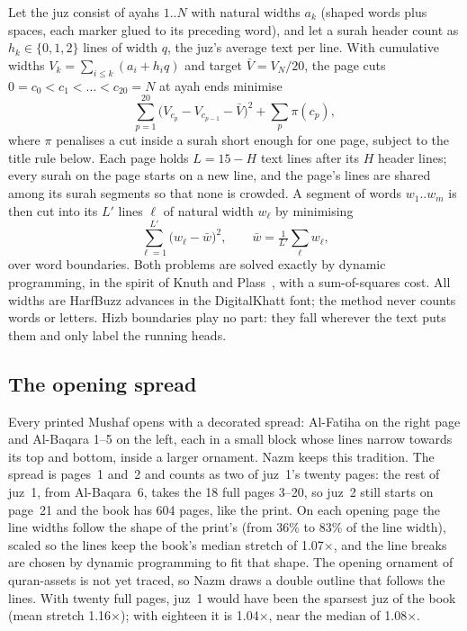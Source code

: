\documentclass[sigconf,nonacm]{acmart}
\newcommand{\x}{\ensuremath{\times}}
\begin{document}
Let the juz consist of ayahs $1..N$ with natural widths $a_k$ (shaped words plus spaces, each marker glued to its preceding word), and let a surah header count as $h_k\in\{0,1,2\}$ lines of width $q$, the juz's average text per line. With cumulative widths $V_k=\sum_{i\le k}(a_i+h_iq)$ and target $\bar V=V_N/20$, the page cuts $0=c_0<c_1<\dots<c_{20}=N$ at ayah ends minimise
\begin{equation}
  \sum_{p=1}^{20}\bigl(V_{c_p}-V_{c_{p-1}}-\bar V\bigr)^2+\sum_{p}\pi(c_p),
  \label{eq:pages}
\end{equation}
where $\pi$ penalises a cut inside a surah short enough for one page, subject to the title rule below. Each page holds $L=15-H$ text lines after its $H$ header lines; every surah on the page starts on a new line, and the page's lines are shared among its surah segments so that none is crowded. A segment of words $w_1..w_m$ is then cut into its $L'$ lines $\ell$ of natural width $w_\ell$ by minimising
\begin{equation}
  \sum_{\ell=1}^{L'}\bigl(w_\ell-\bar w\bigr)^2,\qquad \bar w=\tfrac{1}{L'}\textstyle\sum_\ell w_\ell,
  \label{eq:lines}
\end{equation}
over word boundaries. Both problems are solved exactly by dynamic programming, in the spirit of Knuth and Plass~\cite{knuth1981}, with a sum-of-squares cost. All widths are HarfBuzz advances in the DigitalKhatt font; the method never counts words or letters. Hizb boundaries play no part: they fall wherever the text puts them and only label the running heads.

\subsection{The opening spread}\label{sec:opening}
Every printed Mushaf opens with a decorated spread: Al-Fatiha on the right page and Al-Baqara 1--5 on the left, each in a small block whose lines narrow towards its top and bottom, inside a larger ornament. Nazm keeps this tradition. The spread is pages~1 and~2 and counts as two of juz~1's twenty pages: the rest of juz~1, from Al-Baqara~6, takes the 18 full pages 3--20, so juz~2 still starts on page~21 and the book has 604 pages, like the print. On each opening page the line widths follow the shape of the print's (from 36\% to 83\% of the line width), scaled so the lines keep the book's median stretch of 1.07\x, and the line breaks are chosen by dynamic programming to fit that shape. The opening ornament of quran-assets is not yet traced, so Nazm draws a double outline that follows the lines. With twenty full pages, juz~1 would have been the sparsest juz of the book (mean stretch 1.16\x); with eighteen it is 1.04\x, near the median of 1.08\x.
\end{document}
